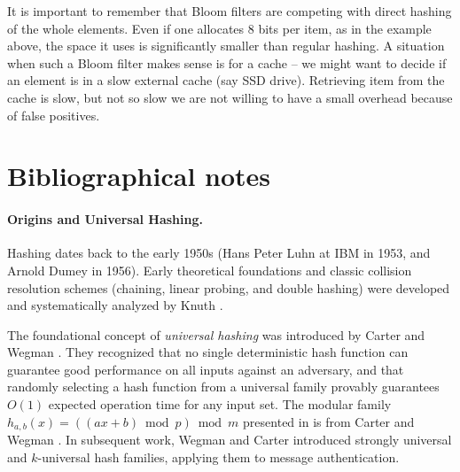 \begin{remark}
    It is important to remember that Bloom filters are competing with
    direct hashing of the whole elements. Even if one allocates $8$
    bits per item, as in the example above, the space it uses is
    significantly smaller than regular hashing. A situation when such
    a Bloom filter makes sense is for a cache -- we might want to
    decide if an element is in a slow external cache (say \si{SSD}
    drive). Retrieving  item from the cache is slow, but not so slow we
    are not willing to have a small overhead because of false
    positives.
\end{remark}





\section{Bibliographical notes}

\paragraph*{Origins and Universal Hashing.}
Hashing dates back to the early 1950s (Hans Peter Luhn at IBM in 1953, and Arnold Dumey in 1956). Early theoretical foundations and classic collision resolution schemes (chaining, linear probing, and double hashing) were developed and systematically analyzed by Knuth \cite{mr-ra-95}.

The foundational concept of \emph{universal hashing} was introduced by Carter and Wegman \cite{cw-uchf-79}. They recognized that no single deterministic hash function can guarantee good performance on all inputs against an adversary, and that randomly selecting a hash function from a universal family provably guarantees $O(1)$ expected operation time for any input set. The modular family $h_{a,b}(x) = ((ax + b) \bmod p) \bmod m$ presented in  is from Carter and Wegman \cite{cw-uchf-79}. In subsequent work, Wegman and Carter \cite{wc-nhafs-81} introduced strongly universal and $k$-universal hash families, applying them to message authentication.

